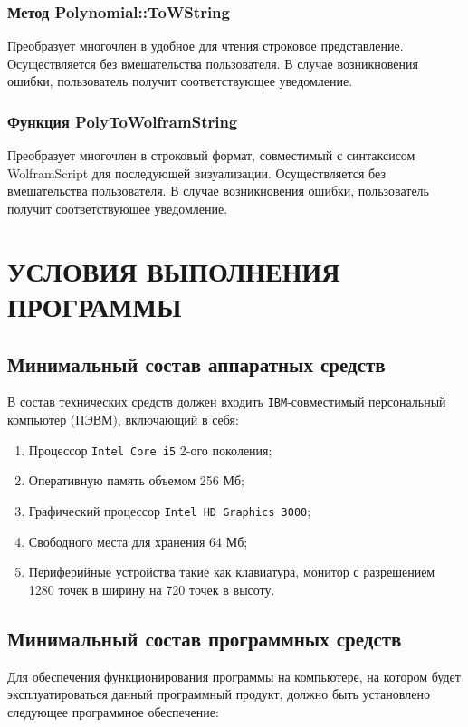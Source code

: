 \documentclass[14pt,a4paper,final]{extreport}
\begin{document}
\subsection{Метод Polynomial::ToWString}
Преобразует многочлен в удобное для чтения строковое представление. Осуществляется без вмешательства пользователя. 
В случае возникновения ошибки, пользователь получит соответствующее уведомление.

\subsection{Функция PolyToWolframString}
Преобразует многочлен в строковый формат, совместимый с синтаксисом WolframScript для последующей визуализации. Осуществляется без вмешательства пользователя. 
В случае возникновения ошибки, пользователь получит соответствующее уведомление.

\chapter{УСЛОВИЯ ВЫПОЛНЕНИЯ ПРОГРАММЫ}

\section{Минимальный состав аппаратных средств}

В состав технических средств должен входить \texttt{IBM}-совместимый персональный компьютер
(ПЭВМ), включающий в себя:
\begin{enumerate}[label=\asbuk*),ref=\asbuk*]
	\item Процессор \texttt{Intel Core i5} 2-ого поколения;
	\item Оперативную память объемом 256 Мб;
	\item Графический процессор \texttt{Intel HD Graphics 3000};
	\item Свободного места для хранения 64 Мб;
	\item Периферийные устройства такие как клавиатура, монитор с разрешением 1280 точек в ширину на 720 точек в высоту.
\end{enumerate}

\section{Минимальный состав программных средств}
Для обеспечения функционирования программы на компьютере, на котором будет эксплуатироваться данный программный продукт, должно быть установлено следующее программное обеспечение:
\end{document}
